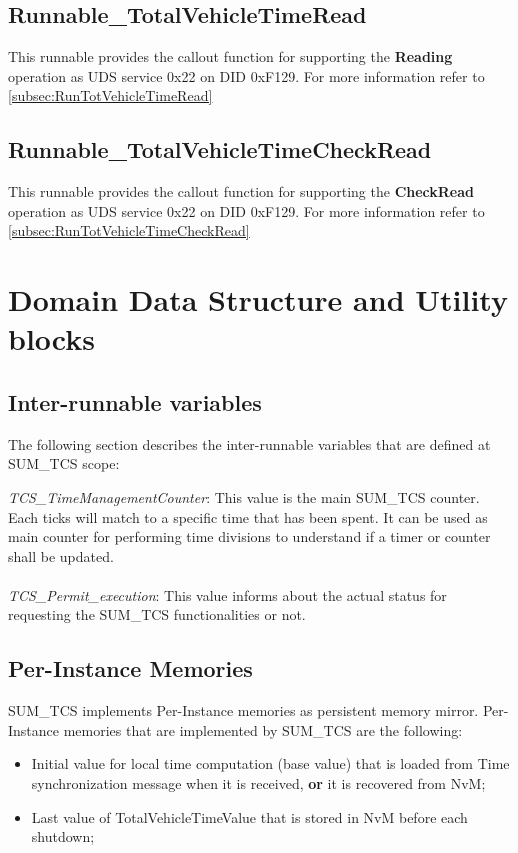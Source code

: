 \subsection{Runnable_TotalVehicleTimeRead}
This runnable provides the callout function for supporting the \textbf{Reading} operation as UDS service 0x22 on DID 0xF129.
For more information refer to \ref{subsec:RunTotVehicleTimeRead}

\subsection{Runnable_TotalVehicleTimeCheckRead}
This runnable provides the callout function for supporting the \textbf{CheckRead} operation as UDS service 0x22 on DID 0xF129.
For more information refer to \ref{subsec:RunTotVehicleTimeCheckRead}

\section{Domain Data Structure and Utility blocks}

\subsection{Inter-runnable variables}
The following section describes the inter-runnable variables that are defined at SUM\_TCS scope:



{\textit{TCS_TimeManagementCounter}: This value is the main SUM\_TCS counter. Each ticks will match to a specific time that has been spent. It can be used as main counter for performing time divisions
to understand if a timer or counter shall be updated.}
\\
\\
{\textit{TCS_Permit_execution}: This value informs about the actual status for requesting the SUM\_TCS functionalities or not.}

\subsection{Per-Instance Memories}
SUM\_TCS implements Per-Instance memories as persistent memory mirror. Per-Instance memories that are implemented by SUM\_TCS are the following:

\begin{itemize}
	\item Initial value for local time computation (base value) that is loaded from Time synchronization message when it is received, \textbf{or}
	it is recovered from NvM;
	
	\item Last value of TotalVehicleTimeValue  that is stored in NvM before each shutdown;
\end{itemize}

